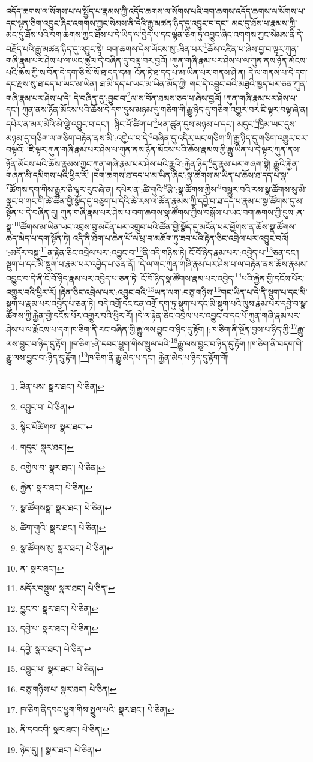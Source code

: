 འདོད་ཆགས་ལ་སོགས་པ་ལ་སྤྱོད་པ་རྣམས་ཀྱི་འདོད་ཆགས་ལ་སོགས་པའི་བག་ཆགས་འདོད་ཆགས་ལ་སོགས་པ་དང་ལྷན་ཅིག་འབྱུང་ཞིང་འགགས་ཀྱང་སེམས་ནི་དེའི་རྒྱུ་མཚན་ཉིད་དུ་འབྱུང་བ་དང་། མང་དུ་ཐོས་པ་རྣམས་ཀྱི་མང་དུ་ཐོས་པའི་བག་ཆགས་ཀྱང་ཐོས་པ་དེ་ཡིད་ལ་བྱེད་པ་དང་ལྷན་ཅིག་ཏུ་འབྱུང་ཞིང་འགགས་ཀྱང་སེམས་ནི་དེ་བརྗོད་པའི་རྒྱུ་མཚན་ཉིད་དུ་འབྱུང་སྟེ། བག་ཆགས་དེས་ཡོངས་སུ་:ཟིན་པར་\footnote{ཟིན་པས་  སྣར་ཐང་།  པེ་ཅིན། }ཆོས་འཛིན་པ་ཞེས་བྱ་བ་ལྟར་ཀུན་གཞི་རྣམ་པར་ཤེས་པ་ལ་ཡང་ཚུལ་དེ་བཞིན་དུ་བལྟ་བར་བྱའོ། །ཀུན་གཞི་རྣམ་པར་ཤེས་པ་ལ་ཀུན་ནས་ཉོན་མོངས་པའི་ཆོས་ཀྱི་ས་བོན་དེ་དག་ཅི་སོ་སོ་ཐ་དད་དམ། འོན་ཏེ་ཐ་དད་པ་མ་ཡིན་པར་གནས་ཤེ་ན། དེ་ལ་གནས་པ་དེ་དག་དང་རྫས་སུ་ཐ་དད་པ་ཡང་མ་ཡིན། ཐ་མི་དད་པ་ཡང་མ་ཡིན་མོད་ཀྱི། གང་དེ་འབྱུང་བའི་མཐུའི་ཁྱད་པར་ཅན་ཀུན་གཞི་རྣམ་པར་ཤེས་པ་དེ། དེ་བཞིན་དུ་:བྱུང་བ་\footnote{འབྱུང་བ་  པེ་ཅིན། }ལ་ས་བོན་ཐམས་ཅད་པ་ཞེས་བྱའོ། །ཀུན་གཞི་རྣམ་པར་ཤེས་པ་དང་། ཀུན་ནས་ཉོན་མོངས་པའི་ཆོས་དེ་དག་དུས་མཉམ་དུ་གཅིག་གི་རྒྱུ་ཉིད་དུ་གཅིག་འགྱུར་བར་ཇི་ལྟར་བལྟ་ཞེ་ན། དཔེར་ན་མར་མེའི་མེ་ལྕེ་འབྱུང་བ་དང་། :སྙིང་པོ་ཚིག་པ་\footnote{སྙིང་པོཚིགས་  སྣར་ཐང་། }ཕན་ཚུན་དུས་མཉམ་པ་དང་། མདུང་\footnote{གདུང་  སྣར་ཐང་། }ཁྱིམ་ཡང་དུས་མཉམ་དུ་གཅིག་ལ་གཅིག་བརྟེན་ནས་མི་:འགྱེལ་བ་དེ་\footnote{འགྱེལ་བ་  སྣར་ཐང་།  པེ་ཅིན། }བཞིན་དུ་འདིར་ཡང་གཅིག་གི་རྒྱུ་ཉིད་དུ་གཅིག་འགྱུར་བར་བལྟའོ། །ཇི་ལྟར་ཀུན་གཞི་རྣམ་པར་ཤེས་པ་ཀུན་ནས་ཉོན་མོངས་པའི་ཆོས་རྣམས་ཀྱི་རྒྱུ་ཡིན་པ་དེ་ལྟར་ཀུན་ནས་ཉོན་མོངས་པའི་ཆོས་རྣམས་ཀྱང་ཀུན་གཞི་རྣམ་པར་ཤེས་པའི་རྒྱུའི་:རྐྱེན་ཉིད་\footnote{རྐྱེན་  སྣར་ཐང་།  པེ་ཅིན། }དུ་རྣམ་པར་གཞག་སྟེ། རྒྱུའི་རྐྱེན་གཞན་མི་དམིགས་པའི་ཕྱིར་རོ། །བག་ཆགས་ཐ་དད་པ་མ་ཡིན་ཞིང་:སྣ་ཚོགས་མ་ཡིན་པ་ཆོས་ཐ་དད་པ་སྣ་\footnote{སྣ་ཚོགསསྣ་  སྣར་ཐང་།  པེ་ཅིན། }ཚོགས་དག་གིས་རྒྱུར་ཅི་ལྟར་རུང་ཞེ་ན། དཔེར་ན་:ཚི་གུའི་\footnote{ཚིག་གུའི་  སྣར་ཐང་།  པེ་ཅིན། }རྩི་:སྣ་ཚོགས་ཀྱིས་\footnote{སྣ་ཚོགས་སུ་  སྣར་ཐང་།  པེ་ཅིན། }བསྒྱུར་བའི་རས་སྣ་ཚོགས་སུ་མི་སྣང་བ་གང་གི་ཚེ་ཚོན་གྱི་སྣོད་དུ་བཅུག་པ་དེའི་ཚེ་རས་ལ་ཚོན་རྣམས་ཀྱི་དབྱེ་བ་ཐ་དད་པ་རྣམ་པ་སྣ་ཚོགས་དུ་མ་སྟོན་པ་དེ་བཞིན་དུ། ཀུན་གཞི་རྣམ་པར་ཤེས་པ་བག་ཆགས་སྣ་ཚོགས་ཀྱིས་བསྒོས་པ་ཡང་བག་ཆགས་ཀྱི་དུས་:ན་སྣ་\footnote{ན་  སྣར་ཐང་། }ཚོགས་མ་ཡིན་ཡང་འབྲས་བུ་མངོན་པར་འགྲུབ་པའི་ཚོན་གྱི་སྣོད་དུ་མངོན་པར་ཕྱོགས་ན་ཆོས་སྣ་ཚོགས་ཚད་མེད་པ་དག་སྟོན་ཏེ། འདི་ནི་ཐེག་པ་ཆེན་པོ་ལ་ཕྲ་བ་མཆོག་ཏུ་ཟབ་པའི་རྟེན་ཅིང་འབྲེལ་པར་འབྱུང་བའོ། །:མདོར་བསྡུ་\footnote{མདོར་བསྡུས་  སྣར་ཐང་།  པེ་ཅིན། }ན་རྟེན་ཅིང་འབྲེལ་པར་:འབྱུང་བ་\footnote{བྱུང་བ་  སྣར་ཐང་།  པེ་ཅིན། }ནི་འདི་གཉིས་ཏེ། ངོ་བོ་ཉིད་རྣམ་པར་:འབྱེད་པ་\footnote{དབྱེ་པ་  སྣར་ཐང་།  པེ་ཅིན། }ཅན་དང་། སྡུག་པ་དང་མི་སྡུག་པ་རྣམ་པར་འབྱེད་པ་ཅན་ནོ། །དེ་ལ་གང་ཀུན་གཞི་རྣམ་པར་ཤེས་པ་ལ་བརྟེན་ནས་ཆོས་རྣམས་འབྱུང་བ་དེ་ནི་ངོ་བོ་ཉིད་རྣམ་པར་འབྱེད་པ་ཅན་ཏེ། ངོ་བོ་ཉིད་སྣ་ཚོགས་རྣམ་པར་འབྱེད་\footnote{དབྱེ་  སྣར་ཐང་།  པེ་ཅིན། }པའི་རྐྱེན་གྱི་དངོས་པོར་འགྱུར་བའི་ཕྱིར་རོ། །རྟེན་ཅིང་འབྲེལ་པར་:འབྱུང་བའི་\footnote{འབྱུང་པ་  སྣར་ཐང་།  པེ་ཅིན། }ཡན་ལག་:བཅུ་གཉིས་\footnote{བཅུ་གཉིས་པ་  སྣར་ཐང་།  པེ་ཅིན། }གང་ཡིན་པ་དེ་ནི་སྡུག་པ་དང་མི་སྡུག་པ་རྣམ་པར་འབྱེད་པ་ཅན་ཏེ། བདེ་འགྲོ་དང་ངན་འགྲོ་དག་ཏུ་སྡུག་པ་དང་མི་སྡུག་པའི་ལུས་རྣམ་པར་དབྱེ་བ་སྣ་ཚོགས་ཀྱི་རྐྱེན་གྱི་དངོས་པོར་འགྱུར་བའི་ཕྱིར་རོ། །དེ་ལ་རྟེན་ཅིང་འབྲེལ་པར་འབྱུང་བ་དང་པོ་ཀུན་གཞི་རྣམ་པར་ཤེས་པ་ལ་རྨོངས་པ་དག་ཁ་ཅིག་ནི་རང་བཞིན་གྱི་རྒྱུ་ལས་བྱུང་བ་ཉིད་དུ་རྟོག །:ཁ་ཅིག་ནི་སྔོན་བྱས་པ་ཉིད་ཀྱི་\footnote{ཁ་ཅིག་ནིདབང་ཕྱུག་གིས་སྤྲུལ་པའི་  སྣར་ཐང་།  པེ་ཅིན། }རྒྱུ་ལས་བྱུང་བ་ཉིད་དུ་རྟོག །ཁ་ཅིག་:ནི་དབང་ཕྱུག་གིས་སྤྲུལ་པའི་\footnote{ནི་དབངགི་  སྣར་ཐང་།  པེ་ཅིན། }རྒྱུ་ལས་བྱུང་བ་ཉིད་དུ་རྟོག །ཁ་ཅིག་ནི་བདག་གི་རྒྱུ་ལས་བྱུང་བ་:ཉིད་དུ་རྟོག །\footnote{ཉིད་དུ། །  སྣར་ཐང་།  པེ་ཅིན། }ཁ་ཅིག་ནི་རྒྱུ་མེད་པ་དང་། རྐྱེན་མེད་པ་ཉིད་དུ་རྟོག་གོ། 